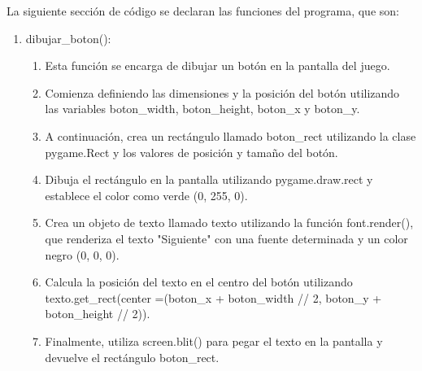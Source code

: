 \begin{enumerate}
La siguiente sección de código se declaran las funciones del programa, que son:\newline
\begin{enumerate}
    \item dibujar\_boton():\newline
    \begin{enumerate}
        \item Esta función se encarga de dibujar un botón en la pantalla del juego.\newline
        \item Comienza definiendo las dimensiones y la posición del botón utilizando las variables boton\_width, boton\_height, boton\_x y boton\_y.\newline
        \item A continuación, crea un rectángulo llamado boton\_rect utilizando la clase pygame.Rect y los valores de posición y tamaño del botón.\newline
        \item Dibuja el rectángulo en la pantalla utilizando pygame.draw.rect y establece el color como verde (0, 255, 0).\newline
        \item Crea un objeto de texto llamado texto utilizando la función font.render(), que renderiza el texto "Siguiente" con una fuente determinada y un color negro (0, 0, 0).\newline
        \item Calcula la posición del texto en el centro del botón utilizando texto.get\_rect(center =(boton\_x + boton\_width // 2, boton\_y + boton\_height // 2)).\newline
        \item Finalmente, utiliza screen.blit() para pegar el texto en la pantalla y devuelve el rectángulo boton\_rect.\newline
    \end{enumerate}


\end{enumerate}
\end{enumerate}
